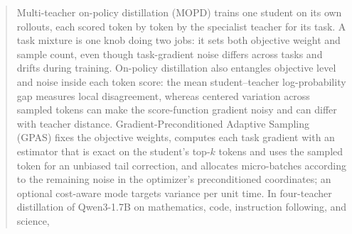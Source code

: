\begin{abstract}

Multi-teacher on-policy distillation (MOPD) trains one student on its own
rollouts, each scored token by token by the specialist teacher for its task.
A task mixture is one knob doing two jobs: it sets both objective weight and
sample count, even though task-gradient noise differs across tasks and drifts
during training. On-policy distillation also entangles objective level and
noise inside each token score: the mean student--teacher log-probability gap
measures local disagreement, whereas centered variation across sampled tokens
can make the score-function gradient noisy and can differ with teacher
distance. Gradient-Preconditioned Adaptive
Sampling (GPAS) fixes the objective weights, computes each task gradient with
an estimator that is exact on the student's top-$k$ tokens and uses the sampled
token for an unbiased tail correction, and allocates micro-batches according
to the remaining noise in the optimizer's preconditioned coordinates; an
optional cost-aware mode targets variance per unit time. In four-teacher
distillation of Qwen3-1.7B on mathematics, code, instruction following, and
science,  

\end{abstract}
